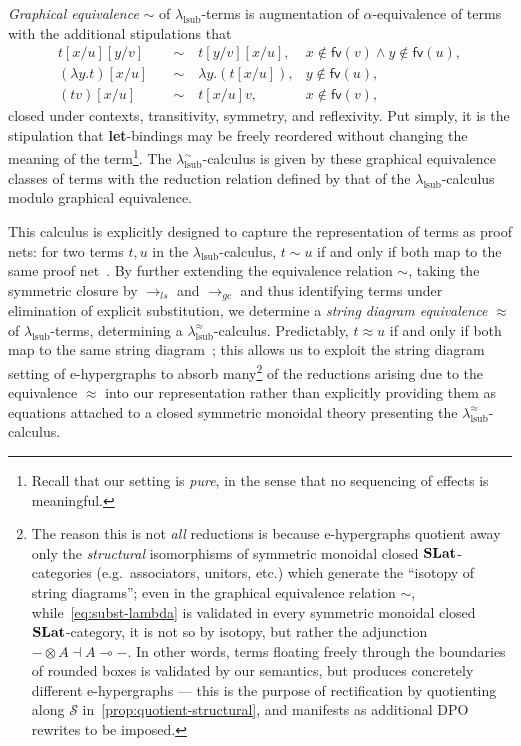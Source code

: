 \emph{Graphical equivalence} $\sim$ of $\lambda_{\text{lsub}}$-terms is augmentation of $\alpha$-equivalence of terms with the additional stipulations that
\begin{align}
	t [x/u] [y/v] \quad        & \sim \quad t [y/v] [x/u],        & x \notin \textsf{fv} (v) \land y \notin \textsf{fv} (u), \nonumber \\
	\label{eq:subst-lambda}
	(\lambda y. t) [x/u] \quad & \sim \quad \lambda y. (t [x/u]), & y \notin \textsf{fv} (u), \tag{$\ast$}                             \\
	(t v) [x/u] \quad          & \sim \quad t [x/u] v,            & x \notin \textsf{fv} (v), \nonumber
\end{align}
closed under contexts, transitivity, symmetry, and reflexivity.
Put simply, it is the stipulation that \textbf{let}-bindings may be freely reordered without changing the meaning of the term\footnote{Recall that our setting is \emph{pure}, in the sense that no sequencing of effects is meaningful.}.
The $\lambda^\sim_{\text{lsub}}$-calculus is given by these graphical equivalence classes of terms with the reduction relation defined by that of the $\lambda_{\text{lsub}}$-calculus modulo graphical equivalence.

This calculus is explicitly designed to capture the representation of terms as proof nets: for two terms $t, u$ in the $\lambda_{\text{lsub}}$-calculus, $t \sim u$ if and only if both map to the same proof net~\cite{?}.
By further extending the equivalence relation $\sim$, taking the symmetric closure by $\to_{ls}$ and $\to_{gc}$ and thus identifying terms under elimination of explicit substitution, we determine a \emph{string diagram equivalence} $\approx$ of $\lambda_{\text{lsub}}$-terms, determining a $\lambda^\approx_{\text{lsub}}$-calculus.
Predictably, $t \approx u$ if and only if both map to the same string diagram~\cite[§ 5.1.1]{ghica2024stringdiagramslambdacalculifunctional}; this allows us to exploit the string diagram setting of e-hypergraphs to absorb many\footnote{The reason this is not \emph{all} reductions is because e-hypergraphs quotient away only the \emph{structural} isomorphisms of symmetric monoidal closed $\mathbf{SLat}$-categories (e.g.\ associators, unitors, etc.) which generate the \enquote{isotopy of string diagrams}; even in the graphical equivalence relation $\sim$, while~\autoref{eq:subst-lambda} is validated in every symmetric monoidal closed $\mathbf{SLat}$-category, it is not so by isotopy, but rather the adjunction $ - \otimes A \dashv A \multimap -$. In other words, terms floating freely through the boundaries of rounded boxes is validated by our semantics, but produces concretely different e-hypergraphs --- this is the purpose of rectification by quotienting along $\mathcal{S}$ in~\autoref{prop:quotient-structural}, and manifests as additional DPO rewrites to be imposed.} of the reductions arising due to the equivalence $\approx$ into our representation rather than explicitly providing them as equations attached to a closed symmetric monoidal theory presenting the $\lambda^\approx_{\text{lsub}}$-calculus.

